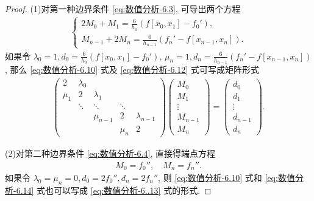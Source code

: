 \documentclass[../../main.tex]{subfiles}%
\begin{document}
\begin{proof}
(1)对第一种边界条件 \eqref{eq:数值分析-6.3}, 可导出两个方程
\begin{align}
\begin{cases}
2 M_0 + M_1 = \frac{6}{h_0} (f[x_0, x_1] - f_0'), \\
M_{n - 1} + 2 M_n = \frac{6}{h_{n - 1}} (f_n' - f[x_{n - 1}, x_n]).
\end{cases} \label{eq:数值分析-6.12}
\end{align}
如果令 $\lambda_0 = 1, d_0 = \frac{6}{h_0} (f[x_0, x_1] - f_0')$, $\mu_n = 1, d_n = \frac{6}{h_{n - 1}} (f_n' - f[x_{n - 1}, x_n])$, 那么 \eqref{eq:数值分析-6.10} 式及 \eqref{eq:数值分析-6.12} 式可写成矩阵形式
\begin{align}
\begin{pmatrix}
2 & \lambda_0 \\
\mu_1 & 2 & \lambda_1 \\
& \ddots & \ddots & \ddots \\
& & \mu_{n - 1} & 2 & \lambda_{n - 1} \\
& & & \mu_n & 2
\end{pmatrix}
\begin{pmatrix}
M_0 \\
M_1 \\
\vdots \\
M_{n - 1} \\
M_n
\end{pmatrix}
=
\begin{pmatrix}
d_0 \\
d_1 \\
\vdots \\
d_{n - 1} \\
d_n
\end{pmatrix}. \label{eq:数值分析-6..13}
\end{align}

(2)对第二种边界条件 \eqref{eq:数值分析-6.4}, 直接得端点方程
\begin{align}
M_0 = f_0'', \quad M_n = f_n''. \label{eq:数值分析-6.14}
\end{align}
如果令 $\lambda_0 = \mu_n = 0, d_0 = 2 f_0'', d_n = 2 f_n''$, 则 \eqref{eq:数值分析-6.10} 式和 \eqref{eq:数值分析-6.14} 式也可以写成 \eqref{eq:数值分析-6..13} 式的形式.


\end{proof}
\end{document}
